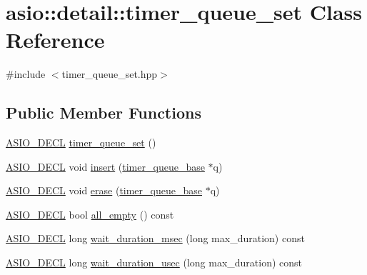 \hypertarget{classasio_1_1detail_1_1timer__queue__set}{}\section{asio\+:\+:detail\+:\+:timer\+\_\+queue\+\_\+set Class Reference}
\label{classasio_1_1detail_1_1timer__queue__set}


{\ttfamily \#include $<$timer\+\_\+queue\+\_\+set.\+hpp$>$}

\subsection*{Public Member Functions}
\begin{DoxyCompactItemize}
\item 
\hyperlink{config_8hpp_ab54d01ea04afeb9a8b39cfac467656b7}{A\+S\+I\+O\+\_\+\+D\+E\+C\+L} \hyperlink{classasio_1_1detail_1_1timer__queue__set_abc3df45cac708813320ac57f820029af}{timer\+\_\+queue\+\_\+set} ()
\item 
\hyperlink{config_8hpp_ab54d01ea04afeb9a8b39cfac467656b7}{A\+S\+I\+O\+\_\+\+D\+E\+C\+L} void \hyperlink{classasio_1_1detail_1_1timer__queue__set_a5bcc7d13fd4c405869d5d724efa0740d}{insert} (\hyperlink{classasio_1_1detail_1_1timer__queue__base}{timer\+\_\+queue\+\_\+base} $\ast$q)
\item 
\hyperlink{config_8hpp_ab54d01ea04afeb9a8b39cfac467656b7}{A\+S\+I\+O\+\_\+\+D\+E\+C\+L} void \hyperlink{classasio_1_1detail_1_1timer__queue__set_a56051939eb368baea53c67ad1c051176}{erase} (\hyperlink{classasio_1_1detail_1_1timer__queue__base}{timer\+\_\+queue\+\_\+base} $\ast$q)
\item 
\hyperlink{config_8hpp_ab54d01ea04afeb9a8b39cfac467656b7}{A\+S\+I\+O\+\_\+\+D\+E\+C\+L} bool \hyperlink{classasio_1_1detail_1_1timer__queue__set_ae591d781cbff1811fb1f093c10b74b7b}{all\+\_\+empty} () const 
\item 
\hyperlink{config_8hpp_ab54d01ea04afeb9a8b39cfac467656b7}{A\+S\+I\+O\+\_\+\+D\+E\+C\+L} long \hyperlink{classasio_1_1detail_1_1timer__queue__set_a21f8058541fc2f63f3e4318139d9ce1c}{wait\+\_\+duration\+\_\+msec} (long max\+\_\+duration) const 
\item 
\hyperlink{config_8hpp_ab54d01ea04afeb9a8b39cfac467656b7}{A\+S\+I\+O\+\_\+\+D\+E\+C\+L} long \hyperlink{classasio_1_1detail_1_1timer__queue__set_a0b80b1337af67254415e13dcbf2b39c0}{wait\+\_\+duration\+\_\+usec} (long max\+\_\+duration) const 
\item 

\end{DoxyCompactItemize}

